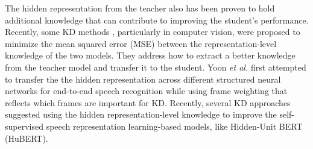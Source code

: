\documentclass[journal]{IEEEtran}
\begin{document}
The hidden representation from the teacher also has been proven to hold additional knowledge that can contribute to improving the student's performance.
Recently, some KD methods \cite{romero-et-al:scheme,at:scheme,fsp:scheme,jacobian:scheme,factor:scheme, boundary:scheme, relation:scheme, showanddistill:scheme}, particularly in computer vision, were proposed to minimize the mean squared error (MSE) between the representation-level knowledge of the two models.
They address how to extract a better knowledge from the teacher model and transfer it to the student.
Yoon \textit{et al.} \cite{tutornet:scheme} first attempted to transfer the the hidden representation across different structured neural networks for end-to-end speech recognition while using frame weighting that reflects which frames are important for KD.
Recently, several KD approaches \cite{distillhubert:scheme, lighthubert:scheme,fithubert} suggested using the hidden representation-level knowledge to improve the self-supervised speech representation learning-based models, like Hidden-Unit BERT (HuBERT).
\end{document}
